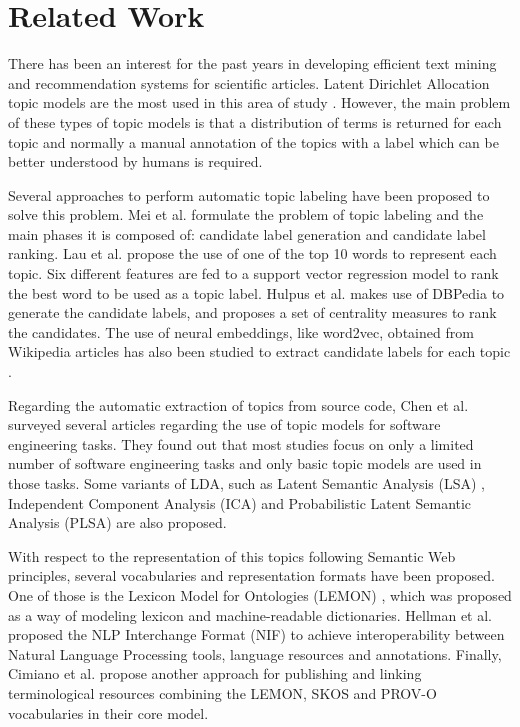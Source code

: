 \documentclass[runningheads]{llncs}
\begin{document}
\section{Related Work} \label{related_work}
There has been an interest for the past years in developing efficient text mining and recommendation systems for scientific articles. Latent Dirichlet Allocation topic models are the most used in this area of study \cite{tong2016text,younus2014utilizing,jelodar2019natural,jelodar2019latent}. However, the main problem of these types of topic models is that a distribution of terms is returned for each topic and normally a manual annotation of the topics with a label which can be better understood by humans is required.

Several approaches to perform automatic topic labeling have been proposed to solve this problem. Mei et al. \cite{mei2007automatic} formulate the problem of topic labeling and the main phases it is composed of: candidate label generation and candidate label ranking. Lau et al. \cite{lau2010best} propose the use of one of the top 10 words to represent each topic. Six different features are fed to a support vector regression model to rank the best word to be used as a topic label. Hulpus et al. \cite{hulpus2013unsupervised} makes use of DBPedia to generate the candidate labels, and proposes a set of centrality measures to rank the candidates. The use of neural embeddings, like word2vec, obtained from Wikipedia articles has also been studied to extract candidate labels for each topic \cite{bhatia2016automatic}.

Regarding the automatic extraction of topics from source code, Chen et al. \cite{chen2016survey} surveyed several articles regarding the use of topic models for software engineering tasks. They found out that most studies focus on only a limited number of software engineering tasks and only basic topic models are used in those tasks. Some variants of LDA, such as Latent Semantic Analysis (LSA) \cite{deerwester1990indexing}, Independent Component Analysis (ICA) \cite{hyvarinen2000independent} and Probabilistic Latent Semantic Analysis (PLSA) \cite{hofmann2013probabilistic} are also proposed.

With respect to the representation of this topics following Semantic Web principles, several vocabularies and representation formats have been proposed. One of those is the Lexicon Model for Ontologies (LEMON) \cite{cimiano2016lexicon}, which was proposed as a way of modeling lexicon and machine-readable dictionaries. Hellman et al. \cite{hellmann2013integrating} proposed the NLP Interchange Format (NIF) to achieve interoperability between Natural Language Processing tools, language resources and annotations. Finally, Cimiano et al. \cite{cimiano2015linked} propose another approach for publishing and linking terminological resources combining the LEMON, SKOS and PROV-O vocabularies in their core model.
\end{document}
